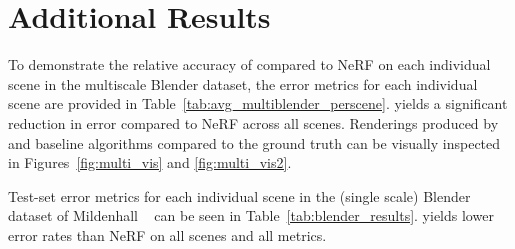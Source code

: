 \documentclass[10pt,twocolumn,letterpaper]{article}
\begin{document}
\begin{table}[]
    \centering
    \caption{
    An evaluation of the IPE features against an alternative approach in which the mean and covariance of the multivariate Gaussian corresponding to a conical frustum are positionally encoded and concatenated. Both approaches perform comparably on the multiscale and single-scale Blender datasets.
    }
    \label{tab:alt_encoding}
\end{table}



\section{Additional Results}

 To demonstrate the relative accuracy of \shortmodelnamelower compared to NeRF on each individual scene in the multiscale Blender dataset, the error metrics for each individual scene are provided in Table~\ref{tab:avg_multiblender_perscene}. \shortmodelname yields a significant reduction in error compared to NeRF across all scenes. Renderings produced by \shortmodelnamelower and baseline algorithms compared to the ground truth can be visually inspected in Figures~\ref{fig:multi_vis} and \ref{fig:multi_vis2}.

 Test-set error metrics for each individual scene in the (single scale) Blender dataset of Mildenhall \etal~\cite{mildenhall2020} can be seen in Table~\ref{tab:blender_results}. \shortmodelname yields lower error rates than NeRF on all scenes and all metrics.
\end{document}
